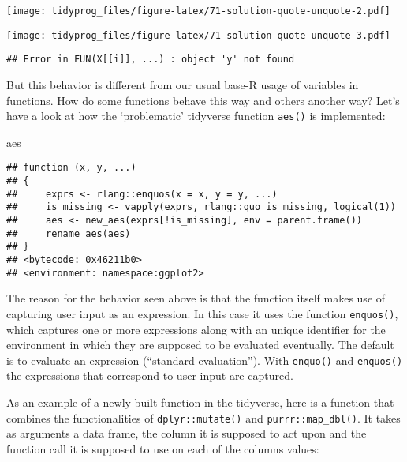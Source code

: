 \documentclass[]{book}
\newenvironment{Shaded}{\begin{snugshade}}{\end{snugshade}}
\newcommand{\KeywordTok}[1]{\textcolor[rgb]{0.13,0.29,0.53}{\textbf{#1}}}
\newcommand{\NormalTok}[1]{#1}
\newcommand{\OperatorTok}[1]{\textcolor[rgb]{0.81,0.36,0.00}{\textbf{#1}}}
\newcommand{\StringTok}[1]{\textcolor[rgb]{0.31,0.60,0.02}{#1}}
\begin{document}
\texttt{[image: tidyprog\_files/figure-latex/71-solution-quote-unquote-2.pdf]}

\begin{Shaded}
\end{Shaded}

\texttt{[image: tidyprog\_files/figure-latex/71-solution-quote-unquote-3.pdf]}

\begin{verbatim}
## Error in FUN(X[[i]], ...) : object 'y' not found
\end{verbatim}

But this behavior is different from our usual base-R usage of variables in functions.
How do some functions behave this way and others another way?
Let's have a look at how the `problematic' tidyverse function \texttt{aes()} is implemented:

\begin{Shaded}
\begin{Highlighting}[]
\NormalTok{aes}
\end{Highlighting}
\end{Shaded}

\begin{verbatim}
## function (x, y, ...) 
## {
##     exprs <- rlang::enquos(x = x, y = y, ...)
##     is_missing <- vapply(exprs, rlang::quo_is_missing, logical(1))
##     aes <- new_aes(exprs[!is_missing], env = parent.frame())
##     rename_aes(aes)
## }
## <bytecode: 0x46211b0>
## <environment: namespace:ggplot2>
\end{verbatim}

The reason for the behavior seen above is that the function itself makes use of capturing user input as an expression.
In this case it uses the function \texttt{enquos()}, which captures one or more expressions along with an unique identifier for the environment in which they are supposed to be evaluated eventually.
The default is to evaluate an expression (``standard evaluation'').
With \texttt{enquo()} and \texttt{enquos()} the expressions that correspond to user input are captured.

As an example of a newly-built function in the tidyverse, here is a function that combines the functionalities of \texttt{dplyr::mutate()} and \texttt{purrr::map\_dbl()}.
It takes as arguments a data frame, the column it is supposed to act upon and the function call it is supposed to use on each of the columns values:
\end{document}
